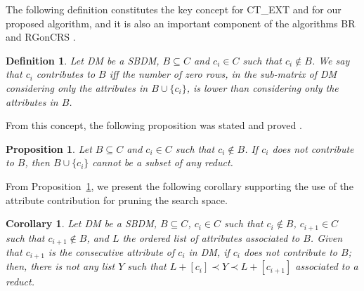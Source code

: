 \documentclass[number,preprint,review,12pt]{elsarticle}
\newtheorem{proposition}{Proposition}
\newtheorem{definition}{Definition}
\newtheorem{corollary}{Corollary}
\begin{document}
	The following definition constitutes the key concept for CT\_EXT \citep{Sanchez07} and for our proposed algorithm, and it is also an important component of the algorithms BR \citep{Lias09} and RGonCRS \citep{WangP07}.
			
	\begin{definition}\label{def:contrib}
		Let DM be a SBDM, $B \subseteq C$ and  $c_i \in C$ such that $c_i \notin B$. We say that $c_i$ contributes to $B$ iff the	number of zero rows, in the sub-matrix of DM considering only the attributes in $B\cup\{c_i\}$, is lower than considering only the attributes in $B$.
	\end{definition}
			
	From this concept, the following proposition was stated and proved \cite{Sanchez07}.
			
	\begin{proposition}\label{prop:contrib} 
		Let $B \subseteq C$ and  $c_i \in C$ such that $c_i \notin B$. If $c_i$ does not contribute to $B$, then $B\cup\{c_i\}$ cannot be a subset of any reduct.
	\end{proposition}
	
	From Proposition~\ref{prop:contrib}, we present the following corollary supporting the use of the attribute contribution for pruning the search space.
	
	\begin{corollary}\label{coro:contrib} 
		Let DM be a SBDM, $B \subseteq C$,  $c_i \in C$ such that $c_i \notin B$, $c_{i+1} \in C$ such that $c_{i+1} \notin B$, and $L$ the ordered list of attributes associated to $B$. Given that $c_{i+1}$ is the consecutive attribute of $c_i$ in DM, if $c_i$ does not contribute to $B$; then, there is not any list $Y$ such that $L+[c_i] \prec Y \prec L+[c_{i+1}]$ associated to a reduct.
	\end{corollary}
	
\end{document}
